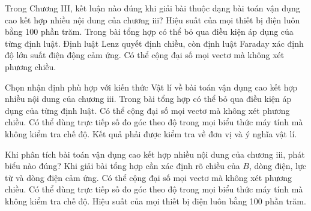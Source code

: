 \begin{ex}
Trong Chương III, kết luận nào đúng khi giải bài thuộc dạng bài toán vận dụng cao kết hợp nhiều nội dung của chương iii?
\choice
{Hiệu suất của mọi thiết bị điện luôn bằng 100 phần trăm.}
{Trong bài tổng hợp có thể bỏ qua điều kiện áp dụng của từng định luật.}
{\True Định luật Lenz quyết định chiều, còn định luật Faraday xác định độ lớn suất điện động cảm ứng.}
{Có thể cộng đại số mọi vectơ mà không xét phương chiều.}
\end{ex}

\begin{ex}
Chọn nhận định phù hợp với kiến thức Vật lí về bài toán vận dụng cao kết hợp nhiều nội dung của chương iii.
\choice
{Trong bài tổng hợp có thể bỏ qua điều kiện áp dụng của từng định luật.}
{Có thể cộng đại số mọi vectơ mà không xét phương chiều.}
{Có thể dùng trực tiếp số đo góc theo độ trong mọi biểu thức máy tính mà không kiểm tra chế độ.}
{\True Kết quả phải được kiểm tra về đơn vị và ý nghĩa vật lí.}
\end{ex}

\begin{ex}
Khi phân tích bài toán vận dụng cao kết hợp nhiều nội dung của chương iii, phát biểu nào đúng?
\choice
{\True Khi giải bài tổng hợp cần xác định rõ chiều của $B$, dòng điện, lực từ và dòng điện cảm ứng.}
{Có thể cộng đại số mọi vectơ mà không xét phương chiều.}
{Có thể dùng trực tiếp số đo góc theo độ trong mọi biểu thức máy tính mà không kiểm tra chế độ.}
{Hiệu suất của mọi thiết bị điện luôn bằng 100 phần trăm.}
\end{ex}

